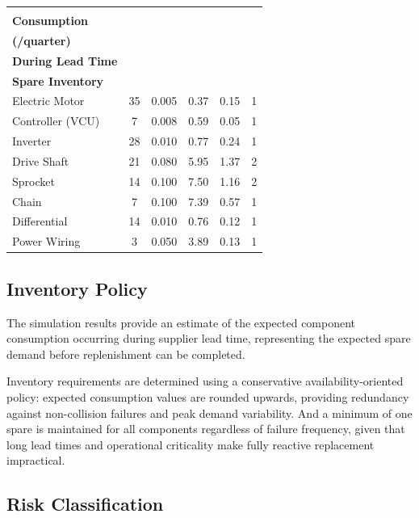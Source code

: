 \documentclass[11pt, a4paper]{report}
\numberwithin{equation}{section}
\begin{document}
\begin{refsection}
\begin{table}[h]
{\begin{tabular}{lccccc}
\makecell{\textbf{Average Spare} \\
\textbf{Consumption} \\
\textbf{(/quarter)}} &

\makecell{\textbf{Expected Consumption} \\
\textbf{During Lead Time}} &

\makecell{\textbf{Recommended} \\
\textbf{Spare Inventory}} \\

\hline

Electric Motor & 35 & 0.005 & 0.37 & 0.15 & 1 \\
Controller (VCU) & 7 & 0.008 & 0.59 & 0.05 & 1 \\
Inverter & 28 & 0.010 & 0.77 & 0.24 & 1 \\
Drive Shaft & 21 & 0.080 & 5.95 & 1.37 & 2 \\
Sprocket & 14 & 0.100 & 7.50 & 1.16 & 2 \\
Chain & 7 & 0.100 & 7.39 & 0.57 & 1 \\
Differential & 14 & 0.010 & 0.76 & 0.12 & 1 \\
Power Wiring & 3 & 0.050 & 3.89 & 0.13 & 1 \\

\hline
\end{tabular}
}

\end{table}

\subsection{Inventory Policy}

The simulation results provide an estimate of the expected component consumption occurring during supplier lead time, representing the expected spare demand before replenishment can be completed.

Inventory requirements are determined using a conservative availability-oriented policy: expected consumption values are rounded upwards, providing redundancy against non-collision failures and peak demand variability. And a minimum of one spare is maintained for all components regardless of failure frequency, given that long lead times and operational criticality make fully reactive replacement impractical.

\subsection{Risk Classification}
\label{sec:risk_classification}


\end{refsection}
\end{document}

